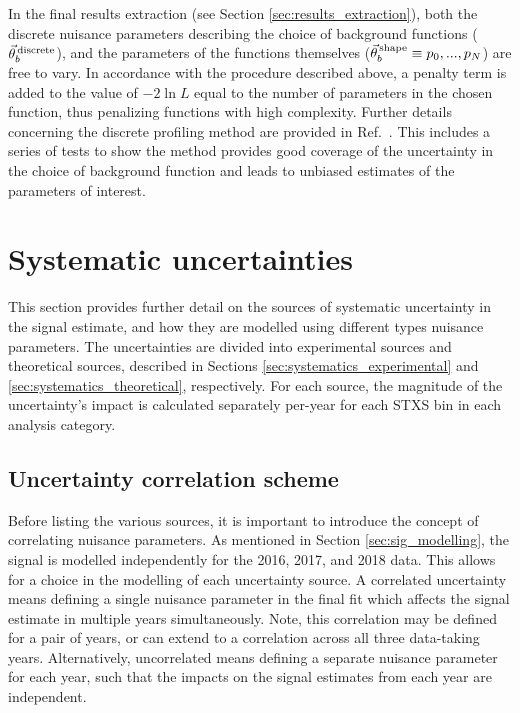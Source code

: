 In the final results extraction (see Section \ref{sec:results_extraction}), both the discrete nuisance parameters describing the choice of background functions ($\vec{\theta}^{\,\rm{discrete}}_{b}$), and the parameters of the functions themselves ($\vec{\theta}^{\,\rm{shape}}_{b} \equiv p_0,...,p_N$) are free to vary. In accordance with the procedure described above, a penalty term is added to the value of $-2\ln{L}$ equal to the number of parameters in the chosen function, thus penalizing functions with high complexity. Further details concerning the discrete profiling method are provided in Ref.~\cite{Dauncey:2014xga}. This includes a series of tests to show the method provides good coverage of the uncertainty in the choice of background function and leads to unbiased estimates of the parameters of interest.

\section{Systematic uncertainties}\label{sec:systematics}
This section provides further detail on the sources of systematic uncertainty in the signal estimate, and how they are modelled using different types nuisance parameters. The uncertainties are divided into experimental sources and theoretical sources, described in Sections \ref{sec:systematics_experimental} and \ref{sec:systematics_theoretical}, respectively. For each source, the magnitude of the uncertainty's impact is calculated separately per-year for each STXS bin in each analysis category.

\subsection{Uncertainty correlation scheme}\label{sec:correlation_scheme}
Before listing the various sources, it is important to introduce the concept of correlating nuisance parameters. As mentioned in Section \ref{sec:sig_modelling}, the signal is modelled independently for the 2016, 2017, and 2018 data. This allows for a choice in the modelling of each uncertainty source. A correlated uncertainty means defining a single nuisance parameter in the final fit which affects the signal estimate in multiple years simultaneously. Note, this correlation may be defined for a pair of years, or can extend to a correlation across all three data-taking years. Alternatively, uncorrelated means defining a separate nuisance parameter for each year, such that the impacts on the signal estimates from each year are independent. 

